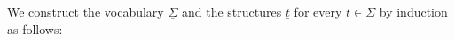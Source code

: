 
We construct the vocabulary $\underline{\Sigma}$ and the structures $\underline{t}$ for every $t\in\Sigma$ by induction as follows:
 

